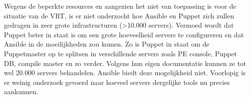 Wegens de beperkte resources en aangezien het niet van toepassing is voor de situatie van de \gls{VRT}, is er niet onderzocht hoe Ansible en Puppet zich zullen gedragen in zeer grote infrastructuren (>10.000 servers). Vermoed wordt dat Puppet beter in staat is om een grote hoeveelheid servers te configureren en dat Ansible in de moeilijkheden zou komen. Zo is Puppet in staat om de Puppetmaster op te splitsen in verschillende servers zoals PE console, Puppet DB, compile master en zo verder. Volgens hun eigen documentatie kunnen ze tot wel 20.000 servers behandelen. Ansible biedt deze mogelijkheid niet. Voorlopig is er weinig onderzoek gevoerd naar hoeveel servers dergelijke tools nu precies aankunnen. 